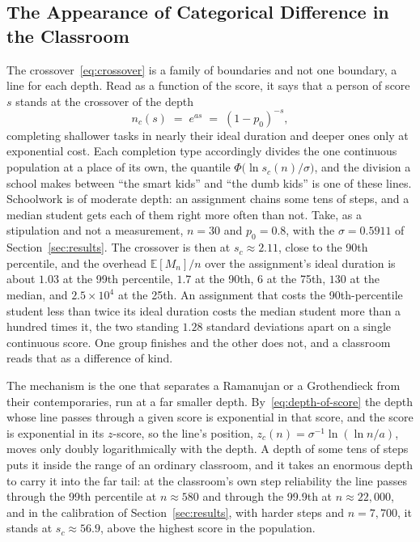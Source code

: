 \documentclass{article}
\begin{document}
\subsection{The Appearance of Categorical Difference in the Classroom}\label{ssec:classroom}

The crossover~\eqref{eq:crossover} is a family of boundaries and not one boundary, a line for each depth. Read as a function of the score, it says that a person of score $s$ stands at the crossover of the depth
\begin{equation}\label{eq:depth-of-score}
  n_c(s) \;=\; e^{a s} \;=\; (1 - p_0)^{-s},
\end{equation}
completing shallower tasks in nearly their ideal duration and deeper ones only at exponential cost. Each completion type accordingly divides the one continuous population at a place of its own, the quantile $\Phi\big(\ln s_c(n)/\sigma\big)$, and the division a school makes between ``the smart kids'' and ``the dumb kids'' is one of these lines. Schoolwork is of moderate depth: an assignment chains some tens of steps, and a median student gets each of them right more often than not. Take, as a stipulation and not a measurement, $n = 30$ and $p_0 = 0.8$, with the $\sigma = 0.5911$ of Section~\ref{sec:results}. The crossover is then at $s_c \approx 2.11$, close to the 90th percentile, and the overhead $\mathbb{E}[M_n]/n$ over the assignment's ideal duration is about $1.03$ at the 99th percentile, $1.7$ at the 90th, $6$ at the 75th, $130$ at the median, and $2.5 \times 10^{4}$ at the 25th. An assignment that costs the 90th-percentile student less than twice its ideal duration costs the median student more than a hundred times it, the two standing $1.28$ standard deviations apart on a single continuous score. One group finishes and the other does not, and a classroom reads that as a difference of kind.

The mechanism is the one that separates a Ramanujan or a Grothendieck from their contemporaries, run at a far smaller depth. By~\eqref{eq:depth-of-score} the depth whose line passes through a given score is exponential in that score, and the score is exponential in its $z$-score, so the line's position, $z_c(n) = \sigma^{-1}\ln(\ln n/a)$, moves only doubly logarithmically with the depth. A depth of some tens of steps puts it inside the range of an ordinary classroom, and it takes an enormous depth to carry it into the far tail: at the classroom's own step reliability the line passes through the 99th percentile at $n \approx 580$ and through the 99.9th at $n \approx 22{,}000$, and in the calibration of Section~\ref{sec:results}, with harder steps and $n = 7{,}700$, it stands at $s_c \approx 56.9$, above the highest score in the population.
\end{document}
